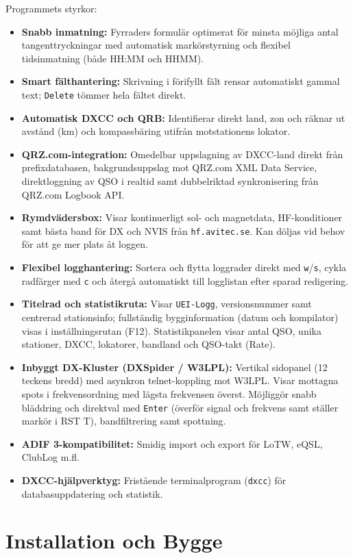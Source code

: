 \documentclass[11pt,a4paper]{article}
\begin{document}
Programmets styrkor:
\begin{itemize}
    \item \textbf{Snabb inmatning:} Fyrraders formulär optimerat för minsta möjliga antal tangenttryckningar med automatisk markörstyrning och flexibel tidsinmatning (både HH:MM och HHMM).
    \item \textbf{Smart fälthantering:} Skrivning i förifyllt fält rensar automatiskt gammal text; \texttt{Delete} tömmer hela fältet direkt.
    \item \textbf{Automatisk DXCC och QRB:} Identifierar direkt land, zon och räknar ut avstånd (km) och kompassbäring utifrån motstationens lokator.
    \item \textbf{QRZ.com-integration:} Omedelbar uppslagning av DXCC-land direkt från prefixdatabasen, bakgrundsuppslag mot QRZ.com XML Data Service, direktloggning av QSO i realtid samt dubbelriktad synkronisering från QRZ.com Logbook API.
    \item \textbf{Rymdvädersbox:} Visar kontinuerligt sol- och magnetdata, HF-konditioner samt bästa band för DX och NVIS från \texttt{hf.avitec.se}. Kan döljas vid behov för att ge mer plats åt loggen.
    \item \textbf{Flexibel logghantering:} Sortera och flytta loggrader direkt med \texttt{w}/\texttt{s}, cykla radfärger med \texttt{c} och återgå automatiskt till logglistan efter sparad redigering.
    \item \textbf{Titelrad och statistikruta:} Visar \texttt{UEI-Logg}, versionsnummer samt centrerad stationsinfo; fullständig bygginformation (datum och kompilator) visas i inställningsrutan (F12). Statistikpanelen visar antal QSO, unika stationer, DXCC, lokatorer, bandland och QSO-takt (Rate).
    \item \textbf{Inbyggt DX-Kluster (DXSpider / W3LPL):} Vertikal sidopanel (12 teckens bredd) med asynkron telnet-koppling mot W3LPL. Visar mottagna spots i frekvensordning med lägsta frekvensen överst. Möjliggör snabb bläddring och direktval med \texttt{Enter} (överför signal och frekvens samt ställer markör i RST T), bandfiltrering samt spottning.
    \item \textbf{ADIF 3-kompatibilitet:} Smidig import och export för LoTW, eQSL, ClubLog m.fl.
    \item \textbf{DXCC-hjälpverktyg:} Fristående terminalprogram (\texttt{dxcc}) för databasuppdatering och statistik.
\end{itemize}

\section{Installation och Bygge}
\label{sec:install}
\end{document}
